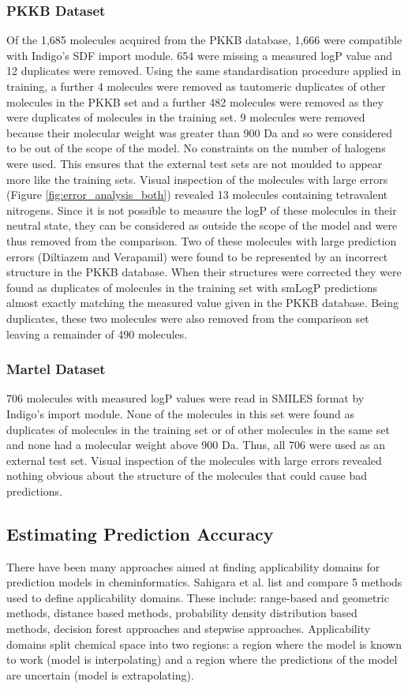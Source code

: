\documentclass[10pt]{bmc_article}
\newenvironment{bmcformat}{\begin{raggedright}\baselineskip20pt\sloppy\setboolean{publ}{false}}{\end{raggedright}\baselineskip20pt\sloppy}
\begin{document}
\begin{bmcformat}
\subsubsection*{PKKB Dataset}
Of the 1,685 molecules acquired from the PKKB database, 1,666 were compatible with Indigo's SDF import module. 654 were missing a measured logP value and 12 duplicates were removed. Using the same standardisation procedure applied in training, a further 4 molecules were removed as tautomeric duplicates of other molecules in the PKKB set and a further 482 molecules were removed as they were duplicates of molecules in the training set. 9 molecules were removed because their molecular weight was greater than 900 Da and so were considered to be out of the scope of the model. No constraints on the number of halogens were used. This ensures that the external test sets are not moulded to appear more like the training sets. Visual inspection of the molecules with large errors (Figure \ref{fig:error_analysis_both}) revealed 13 molecules containing tetravalent nitrogens. Since it is not possible to measure the logP of these molecules in their neutral state, they can be considered as outside the scope of the model and were thus removed from the comparison. Two of these molecules with large prediction errors (Diltiazem and Verapamil) were found to be represented by an incorrect structure in the PKKB database. When their structures were corrected they were found as duplicates of molecules in the training set with smLogP predictions almost exactly matching the measured value given in the PKKB database. Being duplicates, these two molecules were also removed from the comparison set leaving a remainder of 490 molecules.

\subsubsection*{Martel Dataset}
706 molecules with measured logP values were read in SMILES format by Indigo's import module. None of the molecules in this set were found as duplicates of molecules in the training set or of other molecules in the same set and none had a molecular weight above 900 Da. Thus, all 706 were used as an external test set. Visual inspection of the molecules with large errors revealed nothing obvious about the structure of the molecules that could cause bad predictions.  

\subsection*{Estimating Prediction Accuracy}
There have been many approaches aimed at finding applicability domains for prediction models in cheminformatics. Sahigara et al. \cite{sahigara_comparison_2012} list and compare 5 methods used to define applicability domains. These include: range-based and geometric methods, distance based methods, probability density distribution based methods, decision forest approaches and stepwise approaches. Applicability domains split chemical space into two regions: a region where the model is known to work (model is interpolating) and a region where the predictions of the model are uncertain (model is extrapolating).


\end{bmcformat}
\end{document}
